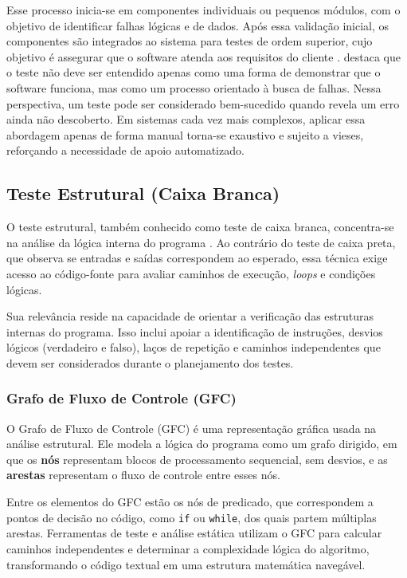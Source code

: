 Esse processo inicia-se em componentes individuais ou pequenos módulos, com o objetivo de identificar falhas lógicas e de dados. Após essa validação inicial, os componentes são integrados ao sistema para testes de ordem superior, cujo objetivo é assegurar que o software atenda aos requisitos do cliente \cite{Sommerville2019}. \cite{Myers2014} destaca que o teste não deve ser entendido apenas como uma forma de demonstrar que o software funciona, mas como um processo orientado à busca de falhas. Nessa perspectiva, um teste pode ser considerado bem-sucedido quando revela um erro ainda não descoberto. Em sistemas cada vez mais complexos, aplicar essa abordagem apenas de forma manual torna-se exaustivo e sujeito a vieses, reforçando a necessidade de apoio automatizado.

\subsection{Teste Estrutural (Caixa Branca)}

O teste estrutural, também conhecido como teste de caixa branca, concentra-se na análise da lógica interna do programa \cite{Delamaro2013}. Ao contrário do teste de caixa preta, que observa se entradas e saídas correspondem ao esperado, essa técnica exige acesso ao código-fonte para avaliar caminhos de execução, \textit{loops} e condições lógicas.

Sua relevância reside na capacidade de orientar a verificação das estruturas internas do programa. Isso inclui apoiar a identificação de instruções, desvios lógicos (verdadeiro e falso), laços de repetição e caminhos independentes que devem ser considerados durante o planejamento dos testes.

\subsubsection{Grafo de Fluxo de Controle (GFC)}

O Grafo de Fluxo de Controle (GFC) é uma representação gráfica usada na análise estrutural. Ele modela a lógica do programa como um grafo dirigido, em que os \textbf{nós} representam blocos de processamento sequencial, sem desvios, e as \textbf{arestas} representam o fluxo de controle entre esses nós.

Entre os elementos do GFC estão os nós de predicado, que correspondem a pontos de decisão no código, como \texttt{if} ou \texttt{while}, dos quais partem múltiplas arestas. Ferramentas de teste e análise estática utilizam o GFC para calcular caminhos independentes e determinar a complexidade lógica do algoritmo, transformando o código textual em uma estrutura matemática navegável.


